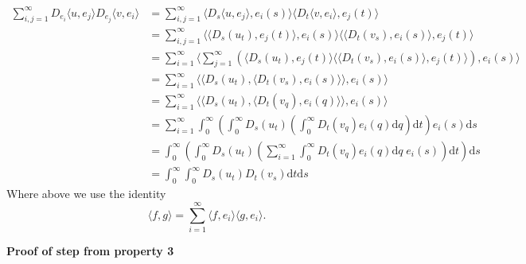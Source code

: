\documentclass[a4paper,11pt]{article}
\numberwithin{equation}{section}
\theoremstyle{plain}
\theoremstyle{definition}
\newcommand{\ud}{\ensuremath{\mathrm{d}}}
\numberwithin{NQ}{section}
\numberwithin{LQ}{section}
\numberwithin{ZQ}{section}
\begin{document}
\begin{align*}
	\sum_{i,j=1}^\infty D_{e_i}\langle u , e_j \rangle D_{e_j}\langle v, e_i \rangle &= 	\sum_{i,j=1}^\infty \bigg\langle D_s\langle u , e_j \rangle, e_i(s) \bigg\rangle \bigg\langle D_t\langle v, e_i\rangle, e_j(t) \bigg\rangle
	\\& = \sum_{i,j=1}^\infty \bigg\langle \langle D_s(u_t) , e_j(t) \rangle, e_i(s) \bigg\rangle \bigg\langle \langle D_t(v_s), e_i(s)\rangle, e_j(t) \bigg\rangle
		\\& = \sum_{i=1}^\infty \bigg\langle\sum_{j=1}^\infty \left( \langle D_s(u_t) , e_j(t) \rangle \bigg\langle \langle D_t(v_s), e_i(s)\rangle, e_j(t) \bigg\rangle\right) , e_i(s) \bigg\rangle
		\\& = \sum_{i=1}^\infty \bigg\langle  \bigg\langle D_s(u_t) , \big\langle D_t(v_s), e_i(s) \big\rangle \bigg\rangle , e_i(s) \bigg\rangle
		\\&= \sum_{i=1}^\infty \bigg\langle  \bigg\langle D_s(u_t) , \big\langle D_t(v_q), e_i(q) \big\rangle \bigg\rangle , e_i(s) \bigg\rangle
		\\& = \sum_{i=1}^\infty \int_0^\infty \left( \int_0^\infty D_s(u_t) \left( \int_0^\infty D_t(v_q)e_i(q) \ud q\right) \ud t \right) e_i(s) \ud s
		\\& =  \int_0^\infty \left( \int_0^\infty D_s(u_t) \left(\sum_{i=1}^\infty \int_0^\infty D_t(v_q)e_i(q) \ud q \;  e_i(s) \right) \ud t \right)\ud s
		\\& =  \int_0^\infty \int_0^\infty D_s(u_t) D_t(v_s) \ud t \ud s
\end{align*}
Where above we use the identity
\[
	\langle f, g \rangle = \sum_{i=1}^\infty \langle f, e_i \rangle \langle g , e_i \rangle.
\]

\textbf{Proof of step from property 3}
\end{document}
